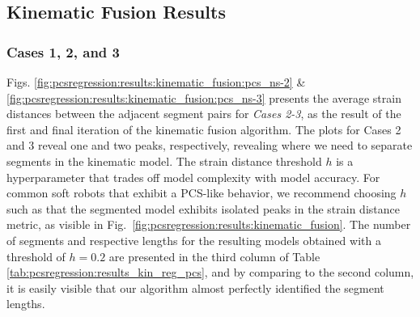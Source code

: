 \subsection{Kinematic Fusion Results}
\subsubsection{Cases 1, 2, and 3}
Figs. \ref{fig:pcsregression:results:kinematic_fusion:pcs_ns-2} \& \ref{fig:pcsregression:results:kinematic_fusion:pcs_ns-3} presents the average strain distances between the adjacent segment pairs for \emph{Cases 2-3}, as the result of the first and final iteration of the kinematic fusion algorithm. 
The plots for Cases 2 and 3 reveal one and two peaks, respectively, revealing where we need to separate segments in the kinematic model.
The strain distance threshold $h$ is a hyperparameter that trades off model complexity with model accuracy.
For common soft robots that exhibit a \gls{PCS}-like behavior, we recommend choosing $h$ such as that the segmented model exhibits isolated peaks in the strain distance metric, as visible in Fig.~\ref{fig:pcsregression:results:kinematic_fusion}.
The number of segments and respective lengths for the resulting models obtained with a threshold of $h=0.2$ are presented in the third column of Table \ref{tab:pcsregression:results_kin_reg_pcs}, and by comparing to the second column, it is easily visible that our algorithm almost perfectly identified the segment lengths. 
%
